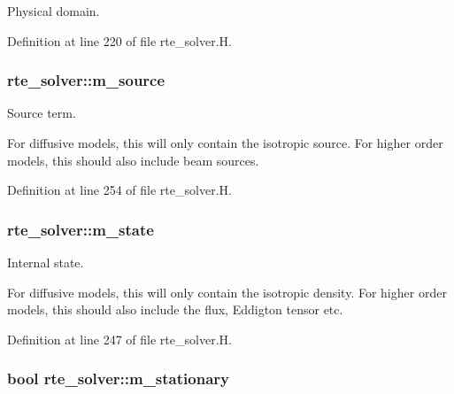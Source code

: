 Physical domain. 



Definition at line 220 of file rte\+\_\+solver.\+H.

\subsubsection[{\texorpdfstring{m\+\_\+source}{m_source}}]{ rte\+\_\+solver\+::m\+\_\+source\hspace{0.3cm}{\ttfamily [protected]}}\hypertarget{classrte__solver_a377bc1e257c98a965b5faf951ae79f09}{}\label{classrte__solver_a377bc1e257c98a965b5faf951ae79f09}


Source term. 

For diffusive models, this will only contain the isotropic source. For higher order models, this should also include beam sources. 

Definition at line 254 of file rte\+\_\+solver.\+H.

\subsubsection[{\texorpdfstring{m\+\_\+state}{m_state}}]{ rte\+\_\+solver\+::m\+\_\+state\hspace{0.3cm}{\ttfamily [protected]}}\hypertarget{classrte__solver_ae4fc24d6160537699f84c3c6a89a926e}{}\label{classrte__solver_ae4fc24d6160537699f84c3c6a89a926e}


Internal state. 

For diffusive models, this will only contain the isotropic density. For higher order models, this should also include the flux, Eddigton tensor etc. 

Definition at line 247 of file rte\+\_\+solver.\+H.

\subsubsection[{\texorpdfstring{m\+\_\+stationary}{m_stationary}}]{\setlength{\rightskip}{0pt plus 5cm}bool rte\+\_\+solver\+::m\+\_\+stationary\hspace{0.3cm}{\ttfamily [protected]}}\hypertarget{classrte__solver_ae32e57e3b2a45d0f7f1e8185ba45555c}{}\label{classrte__solver_ae32e57e3b2a45d0f7f1e8185ba45555c}


